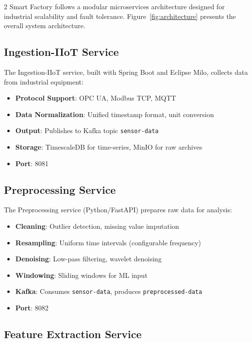 \documentclass{ijceds} %
\begin{document}
\begin{multicols}{2}
Smart Factory follows a modular microservices architecture designed for industrial scalability and fault tolerance. Figure~\ref{fig:architecture} presents the overall system architecture.

\subsection{Ingestion-IIoT Service}

The Ingestion-IIoT service, built with Spring Boot and Eclipse Milo, collects data from industrial equipment:

\begin{itemize}
    \item \textbf{Protocol Support}: OPC UA, Modbus TCP, MQTT
    \item \textbf{Data Normalization}: Unified timestamp format, unit conversion
    \item \textbf{Output}: Publishes to Kafka topic \texttt{sensor-data}
    \item \textbf{Storage}: TimescaleDB for time-series, MinIO for raw archives
    \item \textbf{Port}: 8081
\end{itemize}

\subsection{Preprocessing Service}

The Preprocessing service (Python/FastAPI) prepares raw data for analysis:

\begin{itemize}
    \item \textbf{Cleaning}: Outlier detection, missing value imputation
    \item \textbf{Resampling}: Uniform time intervals (configurable frequency)
    \item \textbf{Denoising}: Low-pass filtering, wavelet denoising
    \item \textbf{Windowing}: Sliding windows for ML input
    \item \textbf{Kafka}: Consumes \texttt{sensor-data}, produces \texttt{preprocessed-data}
    \item \textbf{Port}: 8082
\end{itemize}

\subsection{Feature Extraction Service}


\end{multicols}
\end{document}
